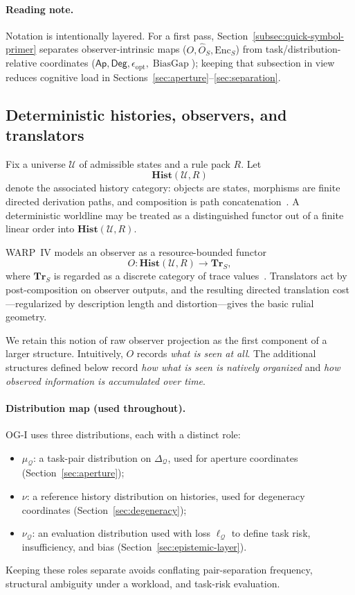 \documentclass[11pt,twoside]{article}
\theoremstyle{definition}
\newcommand{\Hist}{\mathbf{Hist}}
\newcommand{\Tr}{\mathbf{Tr}}
\newcommand{\Enc}{\mathrm{Enc}}
\DeclareMathOperator{\BiasGap}{BiasGap}
\begin{document}
\paragraph{Reading note.}
Notation is intentionally layered. For a first pass, Section~\ref{subsec:quick-symbol-primer} separates observer-intrinsic maps (\(O,\widehat{O}_S,\Enc_S\)) from task/distribution-relative coordinates (\(\mathsf{Ap},\mathsf{Deg},\epsilon_{\mathrm{opt}},\BiasGap\)); keeping that subsection in view reduces cognitive load in Sections~\ref{sec:aperture}--\ref{sec:separation}.

\subsection{Deterministic histories, observers, and translators}
\label{subsec:histories-observers}

Fix a universe \(\mathcal{U}\) of admissible states and a rule pack \(R\). Let
\[
  \Hist(\mathcal{U},R)
\]
denote the associated history category: objects are states, morphisms are finite directed derivation paths, and composition is path concatenation~\cite{ross_paper_iv}. A deterministic worldline may be treated as a distinguished functor out of a finite linear order into \(\Hist(\mathcal{U},R)\).

WARP~IV models an observer as a resource-bounded functor
\[
  O : \Hist(\mathcal{U},R)\to \Tr_S,
\]
where \(\Tr_S\) is regarded as a discrete category of trace values~\cite{ross_paper_iv}. Translators act by post-composition on observer outputs, and the resulting directed translation cost---regularized by description length and distortion---gives the basic rulial geometry.

We retain this notion of raw observer projection as the first component of a larger structure. Intuitively, \(O\) records \emph{what is seen at all}. The additional structures defined below record \emph{how what is seen is natively organized} and \emph{how observed information is accumulated over time}.

\paragraph{Distribution map (used throughout).}
OG-I uses three distributions, each with a distinct role:
\begin{itemize}[leftmargin=*]
  \item \(\mu_{\mathcal{Q}}\): a task-pair distribution on \(\Delta_{\mathcal{Q}}\), used for aperture coordinates (Section~\ref{sec:aperture});
  \item \(\nu\): a reference history distribution on histories, used for degeneracy coordinates (Section~\ref{sec:degeneracy});
  \item \(\nu_{\mathcal{Q}}\): an evaluation distribution used with loss \(\ell_{\mathcal{Q}}\) to define task risk, insufficiency, and bias (Section~\ref{sec:epistemic-layer}).
\end{itemize}
Keeping these roles separate avoids conflating pair-separation frequency, structural ambiguity under a workload, and task-risk evaluation.
\end{document}
